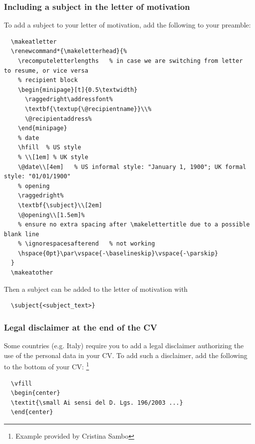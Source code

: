 \documentclass[a4paper, 11pt]{article}
\begin{document}
\subsubsection{Including a subject in the letter of motivation}
\label{section:add:subject}
To add a subject to your letter of motivation, add the following to your preamble:
\begin{lstlisting}
  \makeatletter
  \renewcommand*{\makeletterhead}{%
    \recomputeletterlengths   % in case we are switching from letter to resume, or vice versa
    % recipient block
    \begin{minipage}[t]{0.5\textwidth}
      \raggedright\addressfont%
      \textbf{\textup{\@recipientname}}\\%
      \@recipientaddress%
    \end{minipage}
    % date
    \hfill  % US style
    % \\[1em] % UK style
    \@date\\[4em]   % US informal style: "January 1, 1900"; UK formal style: "01/01/1900"
    % opening
    \raggedright%
    \textbf{\subject}\\[2em]
    \@opening\\[1.5em]%
    % ensure no extra spacing after \makelettertitle due to a possible blank line
    % \ignorespacesafterend   % not working
    \hspace{0pt}\par\vspace{-\baselineskip}\vspace{-\parskip}
  }
  \makeatother
\end{lstlisting}
Then a subject can be added to the letter of motivation with
\begin{lstlisting}
  \subject{<subject_text>}
\end{lstlisting}

\subsubsection{Legal disclaimer at the end of the CV}
Some countries (e.g. Italy) require you to add a legal disclaimer authorizing the use of the personal data in your CV.
To add such a disclaimer, add the following to the bottom of your CV:%
\footnote{Example provided by Cristina Sambo}%
\begin{lstlisting}
  \vfill
  \begin{center}
  \textit{\small Ai sensi del D. Lgs. 196/2003 ...}
  \end{center}
\end{lstlisting}
\end{document}
